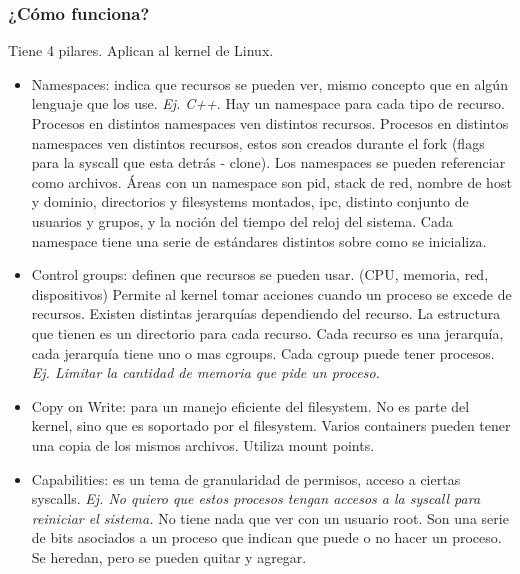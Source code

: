 \documentclass[titlepage,a4paper]{article}
\begin{document}
\subsubsection*{¿Cómo funciona?}

Tiene 4 pilares. Aplican al kernel de Linux.
\begin{itemize}
    \item Namespaces: indica que recursos se pueden ver, mismo concepto que en algún lenguaje que los use. \textit{Ej. C++}. Hay un namespace para cada tipo de recurso. Procesos en distintos namespaces ven distintos recursos. Procesos en distintos namespaces ven distintos recursos, estos son creados durante el fork (flags para la syscall que esta detrás - clone). Los namespaces se pueden referenciar como archivos. Áreas con un namespace son pid, stack de red, nombre de host y dominio, directorios y filesystems montados, ipc, distinto conjunto de usuarios y grupos, y la noción del tiempo del reloj del sistema. Cada namespace tiene una serie de estándares distintos sobre como se inicializa.
    \item Control groups: definen que recursos se pueden usar. (CPU, memoria, red, dispositivos) Permite al kernel tomar acciones cuando un proceso se excede de recursos. Existen distintas jerarquías dependiendo del recurso. La estructura que tienen es un directorio para cada recurso. Cada recurso es una jerarquía, cada jerarquía tiene uno o mas cgroups. Cada cgroup puede tener procesos. \textit{Ej. Limitar la cantidad de memoria que pide un proceso.}
    \item Copy on Write: para un manejo eficiente del filesystem. No es parte del kernel, sino que es soportado por el filesystem. Varios containers pueden tener una copia de los mismos  archivos. Utiliza mount points.
    \item Capabilities: es un tema de granularidad de permisos, acceso a ciertas syscalls. \textit{Ej. No quiero que estos procesos tengan accesos a la syscall para reiniciar el sistema.} No tiene nada que ver con un usuario root. Son una serie de bits asociados a un proceso que indican que puede o no hacer un proceso. Se heredan, pero se pueden quitar y agregar.
\end{itemize}

\newpage
\end{document}
